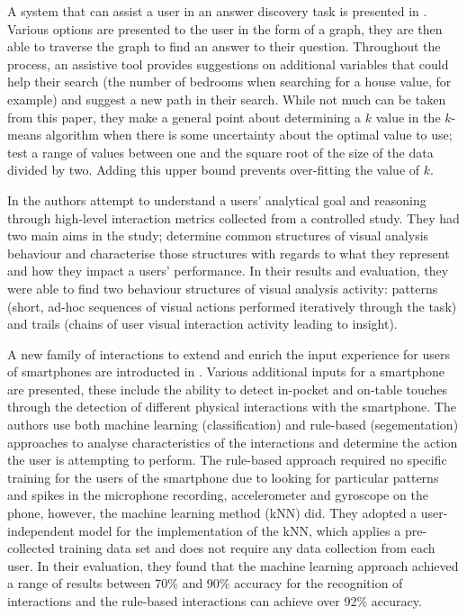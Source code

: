 \documentclass{llncs2e/llncs}
\begin{document}
  A system that can assist a user in an answer discovery task is presented in
  \cite{dabek2017grammar}. Various options are presented to the user in the form
  of a graph, they are then able to traverse the graph to find an answer to their
  question. Throughout the process, an assistive tool provides suggestions on additional
  variables that could help their search (the number of bedrooms when searching for a
  house value, for example) and suggest a new path in their search. While not much can
  be taken from this paper, they make a general point about determining a $k$ value
  in the $k$-means algorithm when there is some uncertainty about the optimal value
  to use; test a range of values between one and the square root of the size of the
  data divided by two. Adding this upper bound prevents over-fitting the value of
  $k$.

  In \cite{gotz2008empirical} the authors attempt to understand a users' analytical
  goal and reasoning through high-level interaction metrics collected from a controlled
  study. They had two main aims in the study; determine common structures of visual
  analysis behaviour and characterise those structures with regards to what they
  represent and how they impact a users' performance. In their results and evaluation,
  they were able to find two behaviour structures of visual analysis activity:
  patterns (short, ad-hoc sequences of visual actions performed iteratively through
  the task) and trails (chains of user visual interaction activity leading to insight).

  A new family of interactions to extend and enrich the input experience for
  users of smartphones are introducted in \cite{zhang2016beyond}. Various additional
  inputs for a smartphone are presented, these include the ability to detect in-pocket
  and on-table touches through the detection of different physical interactions
  with the smartphone. The authors use both machine learning (classification) and
  rule-based (segementation) approaches to analyse characteristics of the interactions
  and determine the action the user is attempting to perform. The rule-based
  approach required no specific training for the users of the smartphone due to looking
  for particular patterns and spikes in the microphone recording, accelerometer and
  gyroscope on the phone, however, the machine learning method (kNN) did. They
  adopted a user-independent model for the implementation of the kNN, which applies
  a pre-collected training data set and does not require any data collection
  from each user. In their evaluation, they found that the machine learning
  approach achieved a range of results between 70\% and 90\% accuracy for the recognition of
  interactions and the rule-based interactions can achieve over 92\% accuracy.
\end{document}
